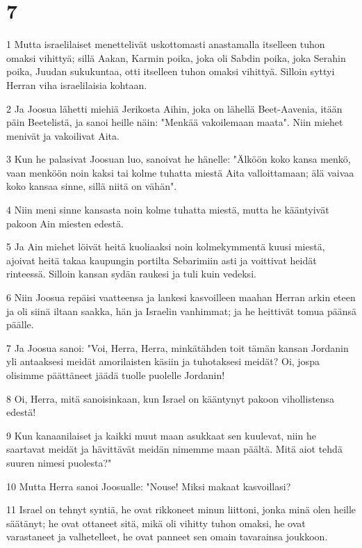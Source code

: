 \chapter{7}

\par 1 Mutta israelilaiset menettelivät uskottomasti anastamalla itselleen tuhon omaksi vihittyä; sillä Aakan, Karmin poika, joka oli Sabdin poika, joka Serahin poika, Juudan sukukuntaa, otti itselleen tuhon omaksi vihittyä. Silloin syttyi Herran viha israelilaisia kohtaan.
\par 2 Ja Joosua lähetti miehiä Jerikosta Aihin, joka on lähellä Beet-Aavenia, itään päin Beetelistä, ja sanoi heille näin: "Menkää vakoilemaan maata". Niin miehet menivät ja vakoilivat Aita.
\par 3 Kun he palasivat Joosuan luo, sanoivat he hänelle: "Älköön koko kansa menkö, vaan menköön noin kaksi tai kolme tuhatta miestä Aita valloittamaan; älä vaivaa koko kansaa sinne, sillä niitä on vähän".
\par 4 Niin meni sinne kansasta noin kolme tuhatta miestä, mutta he kääntyivät pakoon Ain miesten edestä.
\par 5 Ja Ain miehet löivät heitä kuoliaaksi noin kolmekymmentä kuusi miestä, ajoivat heitä takaa kaupungin portilta Sebarimiin asti ja voittivat heidät rinteessä. Silloin kansan sydän raukesi ja tuli kuin vedeksi.
\par 6 Niin Joosua repäisi vaatteensa ja lankesi kasvoilleen maahan Herran arkin eteen ja oli siinä iltaan saakka, hän ja Israelin vanhimmat; ja he heittivät tomua päänsä päälle.
\par 7 Ja Joosua sanoi: "Voi, Herra, Herra, minkätähden toit tämän kansan Jordanin yli antaaksesi meidät amorilaisten käsiin ja tuhotaksesi meidät? Oi, jospa olisimme päättäneet jäädä tuolle puolelle Jordanin!
\par 8 Oi, Herra, mitä sanoisinkaan, kun Israel on kääntynyt pakoon vihollistensa edestä!
\par 9 Kun kanaanilaiset ja kaikki muut maan asukkaat sen kuulevat, niin he saartavat meidät ja hävittävät meidän nimemme maan päältä. Mitä aiot tehdä suuren nimesi puolesta?"
\par 10 Mutta Herra sanoi Joosualle: "Nouse! Miksi makaat kasvoillasi?
\par 11 Israel on tehnyt syntiä, he ovat rikkoneet minun liittoni, jonka minä olen heille säätänyt; he ovat ottaneet sitä, mikä oli vihitty tuhon omaksi, he ovat varastaneet ja valhetelleet, he ovat panneet sen omain tavarainsa joukkoon.
